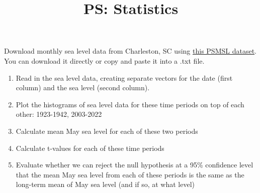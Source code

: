 \documentclass{article}
\title{\vspace{-1in} PS: Statistics}
\date{}
\newcommand{\be}{\begin{enumerate}}
\newcommand{\ee}{\end{enumerate}}
\begin{document}
\maketitle

Download monthly sea level data from Charleston, SC using \href{https://psmsl.org/data/obtaining/rlr.monthly.data/234.rlrdata}{this PSMSL dataset}. You can download it directly or copy and paste it into a .txt file.

\be
\item Read in the sea level data, creating separate vectors for the date (first column) and the sea level (second column).

\item Plot the histograms of sea level data for these time periods on top of each other: 1923-1942, 2003-2022

\item Calculate mean May sea level for each of these two periods

\item Calculate t-values for each of these time periods

\item Evaluate whether we can reject the null hypothesis at a 95\% confidence level that the mean May sea level from each of these periods is the same as the long-term mean of May sea level (and if so, at what level) 


\ee
\end{document}
